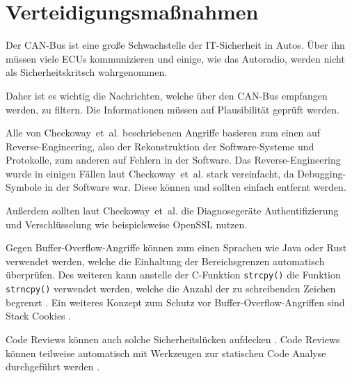 \chapter{Verteidigungsmaßnahmen}\label{ch:defense}
Der CAN-Bus ist eine große Schwachstelle der IT-Sicherheit in Autos. Über ihn
müssen viele ECUs kommunizieren und einige, wie das Autoradio, werden nicht als
Sicherheitskritsch wahrgenommen.

Daher ist es wichtig die Nachrichten, welche über den CAN-Bus empfangen werden,
zu filtern. Die Informationen müssen auf Plausibilität geprüft werden.

Alle von Checkoway~et~al. beschriebenen Angriffe basieren zum einen auf
Reverse-Engineering, also der Rekonstruktion der Software-Systeme und
Protokolle, zum anderen auf Fehlern in der Software. Das Reverse-Engineering
wurde in einigen Fällen laut Checkoway~et~al. stark vereinfacht, da
Debugging-Symbole in der Software war. Diese können und sollten einfach
entfernt werden.

Außerdem sollten laut Checkoway~et~al. die Diagnosegeräte Authentifizierung und
Verschlüsselung wie beispielsweise OpenSSL nutzen.

Gegen Buffer-Overflow-Angriffe können zum einen Sprachen wie Java oder Rust
verwendet werden, welche die Einhaltung der Bereichsgrenzen automatisch
überprüfen. Des weiteren kann anstelle der C-Funktion \verb+strcpy()+ die
Funktion \verb+strncpy()+ verwendet werden, welche die Anzahl der zu
schreibenden Zeichen begrenzt \cite{Eckert2012}. Ein weiteres Konzept zum
Schutz vor Buffer-Overflow-Angriffen sind Stack Cookies \cite{Bray2002}.

Code Reviews können auch solche Sicherheitslücken aufdecken \cite{Howard2006}.
Code Reviews können teilweise automatisch mit Werkzeugen zur statischen Code
Analyse durchgeführt werden \cite{McGraw2008}.